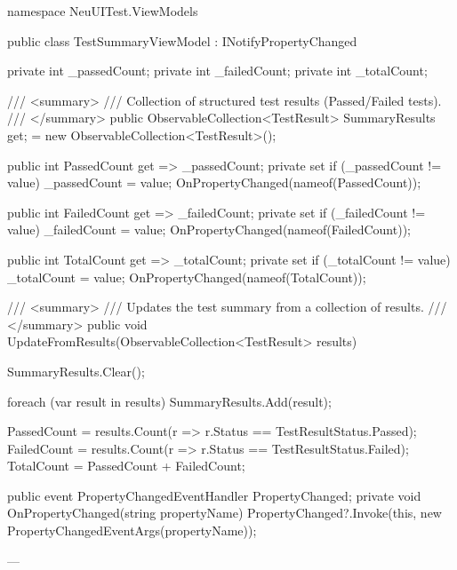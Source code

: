 namespace NeuUITest.ViewModels
{
    public class TestSummaryViewModel : INotifyPropertyChanged
    {
        private int _passedCount;
        private int _failedCount;
        private int _totalCount;

        /// <summary>
        /// Collection of structured test results (Passed/Failed tests).
        /// </summary>
        public ObservableCollection<TestResult> SummaryResults { get; }
            = new ObservableCollection<TestResult>();

        public int PassedCount
        {
            get => _passedCount;
            private set
            {
                if (_passedCount != value)
                {
                    _passedCount = value;
                    OnPropertyChanged(nameof(PassedCount));
                }
            }
        }

        public int FailedCount
        {
            get => _failedCount;
            private set
            {
                if (_failedCount != value)
                {
                    _failedCount = value;
                    OnPropertyChanged(nameof(FailedCount));
                }
            }
        }

        public int TotalCount
        {
            get => _totalCount;
            private set
            {
                if (_totalCount != value)
                {
                    _totalCount = value;
                    OnPropertyChanged(nameof(TotalCount));
                }
            }
        }

        /// <summary>
        /// Updates the test summary from a collection of results.
        /// </summary>
        public void UpdateFromResults(ObservableCollection<TestResult> results)
        {
            SummaryResults.Clear();

            foreach (var result in results)
            {
                SummaryResults.Add(result);
            }

            PassedCount = results.Count(r => r.Status == TestResultStatus.Passed);
            FailedCount = results.Count(r => r.Status == TestResultStatus.Failed);
            TotalCount = PassedCount + FailedCount;
        }

        public event PropertyChangedEventHandler PropertyChanged;
        private void OnPropertyChanged(string propertyName)
        {
            PropertyChanged?.Invoke(this, new PropertyChangedEventArgs(propertyName));
        }
    }
}


---


